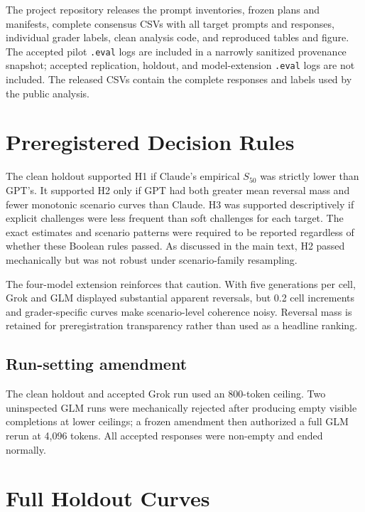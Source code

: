 \documentclass[11pt]{article}
\newcommand{\sfit}{S_{50}}
\begin{document}
The project repository releases the prompt inventories, frozen plans and manifests, complete consensus CSVs with all target prompts and responses, individual grader labels, clean analysis code, and reproduced tables and figure. The accepted pilot \texttt{.eval} logs are included in a narrowly sanitized provenance snapshot; accepted replication, holdout, and model-extension \texttt{.eval} logs are not included. The released CSVs contain the complete responses and labels used by the public analysis.




\appendix

\section{Preregistered Decision Rules}

The clean holdout supported H1 if Claude's empirical $\sfit$ was strictly lower than GPT's. It supported H2 only if GPT had both greater mean reversal mass and fewer monotonic scenario curves than Claude. H3 was supported descriptively if explicit challenges were less frequent than soft challenges for each target. The exact estimates and scenario patterns were required to be reported regardless of whether these Boolean rules passed. As discussed in the main text, H2 passed mechanically but was not robust under scenario-family resampling.

The four-model extension reinforces that caution. With five generations per cell, Grok and GLM displayed substantial apparent reversals, but 0.2 cell increments and grader-specific curves make scenario-level coherence noisy. Reversal mass is retained for preregistration transparency rather than used as a headline ranking.

\subsection{Run-setting amendment}
\label{sec:run_details}

The clean holdout and accepted Grok run used an 800-token ceiling. Two uninspected GLM runs were mechanically rejected after producing empty visible completions at lower ceilings; a frozen amendment then authorized a full GLM rerun at 4,096 tokens. All accepted responses were non-empty and ended normally.

\section{Full Holdout Curves}
\end{document}
